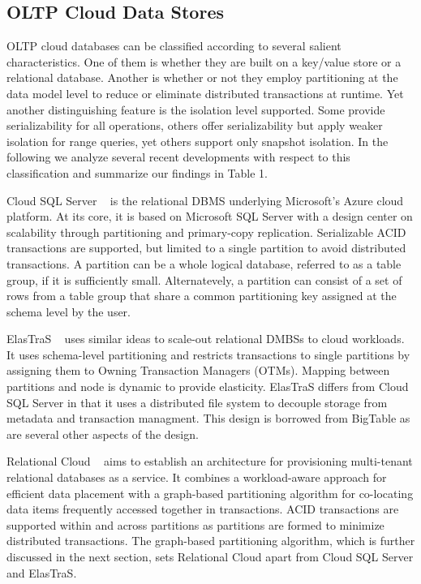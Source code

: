 \documentclass[10pt,final,journal]{IEEEtran}
\begin{document}
\subsection{OLTP Cloud Data Stores}
OLTP cloud databases can be classified according to several salient characteristics. One of them is whether they are built on a key/value store or a relational database. Another is whether or not they employ partitioning at the data model level to reduce or eliminate distributed transactions at runtime. Yet another distinguishing feature is the isolation level supported. Some provide serializability for all operations, others offer serializability but apply weaker isolation for range queries, yet others support only snapshot isolation. In the following we analyze several recent developments with respect to this classification and summarize our findings in Table 1.

Cloud SQL Server ~\cite{Campbell:2010:ESF:1807167.1807280, Bernstein:2011:AMS:2004686.2005651} is the relational DBMS underlying Microsoft's Azure cloud platform. At its core, it is based on Microsoft SQL Server with a design center on scalability through partitioning and primary-copy replication. Serializable ACID transactions are supported, but limited to a single partition to avoid distributed transactions. A partition can be a whole logical database, referred to as a table group, if it is sufficiently small. Alternatevely, a partition can consist of a set of rows from a table group that share a common partitioning key assigned at the schema level by the user.

ElasTraS ~\cite{Das:2009:EET:1855533.1855540, Das:2010:EAE} uses similar ideas to scale-out relational DMBSs to cloud workloads. It uses schema-level partitioning and restricts transactions to single partitions by assigning them to Owning Transaction Managers (OTMs). Mapping between partitions and node is dynamic to provide elasticity. ElasTraS differs from Cloud SQL Server in that it uses a distributed file system to decouple storage from metadata and transaction managment. This design is borrowed from BigTable as are several other aspects of the design.

Relational Cloud ~\cite{Curino:2011:JPMWMBZ11} aims to establish an architecture for provisioning multi-tenant relational databases as a service. It combines a workload-aware approach for efficient data placement with a graph-based partitioning algorithm for co-locating data items frequently accessed together in transactions. ACID transactions are supported within and across partitions as partitions are formed to minimize distributed transactions. The graph-based partitioning algorithm, which is further discussed in the next section,  sets Relational Cloud apart from Cloud SQL Server and ElasTraS.
\end{document}
